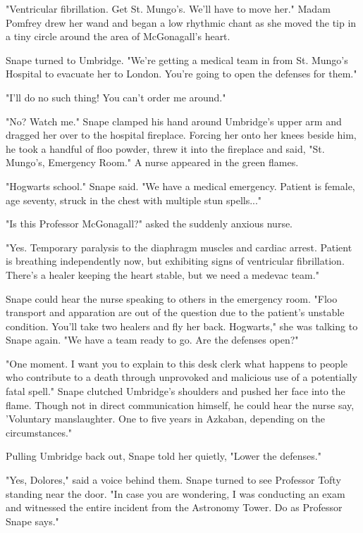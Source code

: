\documentclass[a4paper,11pt]{article}
\begin{document}
"Ventricular fibrillation. Get St. Mungo's. We'll have to move her." Madam Pomfrey drew her wand and began a low rhythmic chant as she moved the tip in a tiny circle around the area of McGonagall's heart.

Snape turned to Umbridge. "We're getting a medical team in from St. Mungo's Hospital to evacuate her to London. You're going to open the defenses for them."

"I'll do no such thing! You can't order me around."

"No? Watch me." Snape clamped his hand around Umbridge's upper arm and dragged her over to the hospital fireplace. Forcing her onto her knees beside him, he took a handful of floo powder, threw it into the fireplace and said, "St. Mungo's, Emergency Room." A nurse appeared in the green flames.

"Hogwarts school." Snape said. "We have a medical emergency. Patient is female, age seventy, struck in the chest with multiple stun spells..."

"Is this Professor McGonagall?" asked the suddenly anxious nurse.

"Yes. Temporary paralysis to the diaphragm muscles and cardiac arrest. Patient is breathing independently now, but exhibiting signs of ventricular fibrillation. There's a healer keeping the heart stable, but we need a medevac team."

Snape could hear the nurse speaking to others in the emergency room. "Floo transport and apparation are out of the question due to the patient's unstable condition. You'll take two healers and fly her back. Hogwarts," she was talking to Snape again. "We have a team ready to go. Are the defenses open?"

"One moment. I want you to explain to this desk clerk what happens to people who contribute to a death through unprovoked and malicious use of a potentially fatal spell." Snape clutched Umbridge's shoulders and pushed her face into the flame. Though not in direct communication himself, he could hear the nurse say, 'Voluntary manslaughter. One to five years in Azkaban, depending on the circumstances."

Pulling Umbridge back out, Snape told her quietly, "Lower the defenses."

"Yes, Dolores," said a voice behind them. Snape turned to see Professor Tofty standing near the door. "In case you are wondering, I was conducting an exam and witnessed the entire incident from the Astronomy Tower. Do as Professor Snape says."
\end{document}
